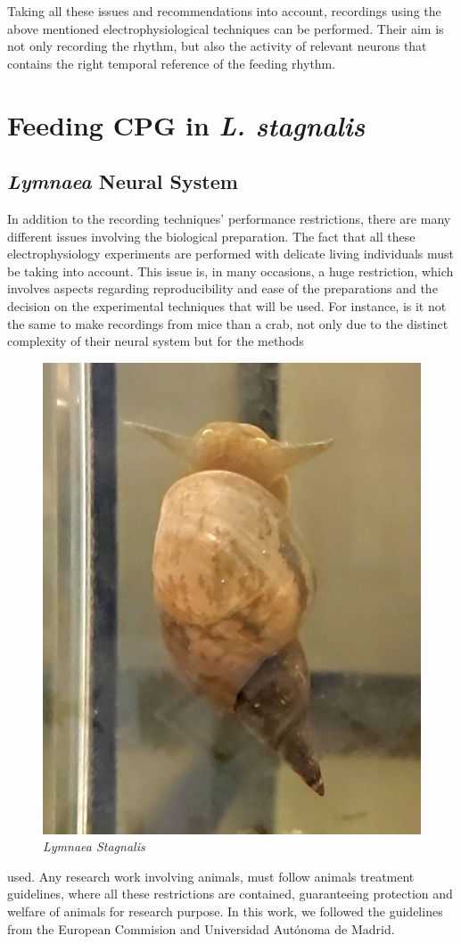 Taking all these issues and recommendations into account, recordings using the above mentioned electrophysiological techniques can be performed. Their aim is not only recording the rhythm, but also the activity of relevant neurons that contains the right temporal reference of the feeding rhythm.

\section{Feeding CPG in \textit{L. stagnalis}}
%


\subsection{\textit{Lymnaea} Neural System} 
\label{subsec: Lymnaea}
In addition to the recording techniques' performance restrictions, there are many different issues involving the biological preparation. The fact that all these electrophysiology experiments are performed with delicate living individuals must be taking into account. This issue is, in many occasions, a huge restriction, which involves aspects regarding reproducibility and ease of the preparations and the decision on the experimental techniques that will be used. For instance, is it not the same to make recordings from mice than a crab, not only due to the distinct complexity of their neural system  but for the methods
\begin{figure}
	\centering
	\includegraphics[width=0.7\linewidth]{img/methods/lymnaea_copy.jpg} 
	\caption{\textit{Lymnaea Stagnalis}}
	\label{fig:snail}
\end{figure} used. Any research work involving animals, must follow animals treatment guidelines, where all these restrictions are contained, guaranteeing protection and welfare of animals for research purpose. In this work, we followed the guidelines from the European Commision and Universidad Autónoma de Madrid.


